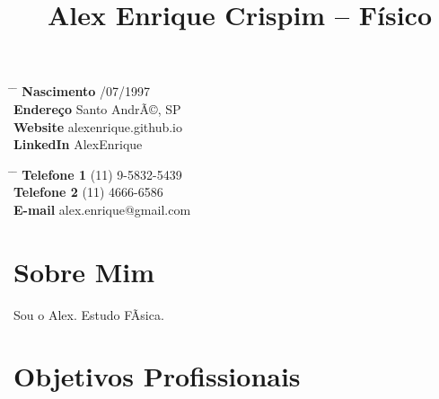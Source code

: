 \documentclass[10pt]{article} %
\begin{document}

\title{Alex Enrique Crispim -- Físico} %


\parbox{0.5\textwidth}{ %
\begin{tabbing} %
\hspace{3cm} \= \hspace{4cm} \= \kill %
{\bf Nascimento} /07/1997\\{\bf Endereço} \> Santo AndrÃ©, SP\\ %
{\bf Website} \> alexenrique.github.io \\ %
{\bf LinkedIn} \> AlexEnrique \\ %
\end{tabbing}}
\hfill %
\parbox{0.5\textwidth}{ %
\begin{tabbing} %
\hspace{3cm} \= \hspace{4cm} \= \kill %
{\bf Telefone 1 } \> (11) 9-5832-5439 \\ %
{\bf Telefone 2 } \> (11) 4666-6586 \\ %
{\bf E-mail} \> alex.enrique@gmail.com \\ %
\end{tabbing}}


\section{Sobre Mim}

Sou o Alex.
Estudo FÃ­sica.


\section{Objetivos Profissionais}
\end{document}
